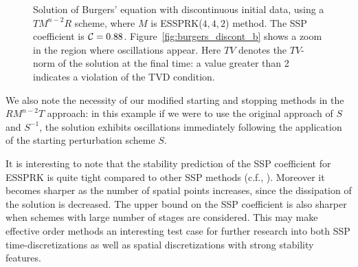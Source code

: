 \begin{figure}
    \centering
    \caption{Solution of Burgers' equation with discontinuous initial data, using a 
    $TM^{n-2}R$ scheme, where $M$ is ESSPRK($4,4,2$) method. 
    The SSP coefficient is $ \mathcal{C} = 0.88$. 
    Figure~\ref{fig:burgers_discont_b} shows a zoom in the region where 
    oscillations appear.
    Here $TV$ denotes the $TV$-norm of the solution at the final time:
    a value greater than 2 indicates a violation of the TVD condition.
    }
    \label{fig:burgers_discont}
\end{figure}

We also note the necessity of our modified starting and stopping methods in the $RM^{n-2}T$ approach: in this
example if we were to use the original approach of $S$ and $S^{-1}$,
the solution exhibits oscillations immediately following the
application of the starting perturbation scheme $S$.


It is interesting to note that the stability prediction of the SSP
coefficient for ESSPRK is quite tight compared to other SSP methods
(c.f., \cite[Table 5.1]{Ketcheson/Gottlieb/Macdonald:TSRK}).
Moreover it becomes sharper as the number of spatial points increases,
since the dissipation of the solution is decreased.
The upper bound on the SSP coefficient is also sharper when schemes 
with large number of stages are considered.
This may make effective order methods an interesting test case for
further research into both SSP time-discretizations as well as spatial
discretizations with strong stability features.



